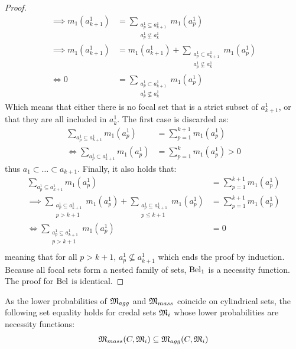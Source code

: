 \begin{proof}
\begin{align*}
        \implies m_1(a^1_{k+1}) &= \sum_{\substack{a^1_p\subseteq a^1_{k+1} \\ a^1_p\not\subseteq a^1_k}} m_1(a^1_p)\\
        \implies m_1(a^1_{k+1}) &= m_1(a^1_{k+1}) + \sum_{\substack{a^1_p\subset a^1_{k+1} \\ a^1_p\not\subseteq a^1_k}} m_1(a^1_p)\\
        \Leftrightarrow 0 &= \sum_{\substack{a^1_p\subset a^1_{k+1} \\ a^1_p\not\subseteq a^1_k}} m_1(a^1_p)
    \end{align*}
    Which means that either there is no focal set that is a strict subset of $a^1_{k+1}$, or that they are all included in $a^1_{k}$. The first case is discarded as:
    \begin{align*}
        \sum_{a^1_p\subseteq a^1_{k+1}}m_1(a^1_p) &= \sum_{p=1}^{k+1}m_1(a^1_p)\\
        \Leftrightarrow \sum_{a^1_p\subset a^1_{k+1}}m_1(a^1_p) &= \sum_{p=1}^{k}m_1(a^1_p)>0
    \end{align*}
    thus $a_1\subset\dots\subset a_{k+1}$.
    Finally, it also holds that:
    \begin{align*}
        \sum_{a^1_p\subseteq a^1_{k+1}}m_1(a^1_p) &= \sum_{p=1}^{k+1}m_1(a^1_p)\\
        \implies \sum_{\substack{a^1_p\subseteq a^1_{k+1} \\ p>k+1}} m_1(a^1_p) + \sum_{\substack{a^1_p\subseteq a^1_{k+1} \\ p\leqslant k+1}} m_1(a^1_p) &= \sum_{p=1}^{k+1}m_1(a^1_p)\\
        \Leftrightarrow \sum_{\substack{a^1_p\subseteq a^1_{k+1} \\ p>k+1}} m_1(a^1_p) &= 0\\
    \end{align*}
    meaning that for all $p>k+1$, $a^1_p\not\subseteq a^1_{k+1}$ which ends the proof by induction. Because all focal sets form a nested family of sets, ${\mathrm{Bel}}_1$ is a necessity function. The proof for ${\mathrm{Bel}} $ is identical. 
\end{proof}

As the lower probabilities of ${\mathfrak{M}}_{agg}$ and ${\mathfrak{M}}_{mass}$ coincide on cylindrical sets, the following set equality holds for credal sets ${\mathfrak{M}}_i$ whose lower probabilities are necessity functions:
\begin{eqnarray}\label{eq:inclusion_necessity}
    {\mathfrak{M}}_{mass}(C, {\mathfrak{M}}_i) \subseteq {\mathfrak{M}}_{agg}(C, {\mathfrak{M}}_i)
\end{eqnarray}

